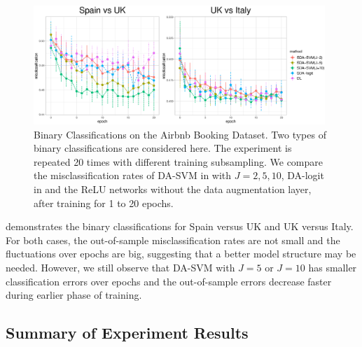 \documentclass[ba]{imsart}
\numberwithin{equation}{section}
\theoremstyle{plain}
\begin{document}
\begin{figure}[!ht]
\centering
\includegraphics[width=0.98\textwidth, height=0.4\textwidth]{fig/airbnb_adam.eps}
\vspace{-0.15in}
\caption{Binary Classifications on the Airbnb Booking Dataset. Two types of binary classifications are considered here. The experiment is repeated 20 times with different training subsampling. We compare the misclassification rates of DA-SVM in  with $J=2, 5, 10$, DA-logit in  and the ReLU networks without the data augmentation layer, after training for 1 to 20 epochs. }\label{fig:airbnb}
\vspace{-0.15in}
\end{figure}

 demonstrates the binary classifications for Spain versus UK and UK versus Italy. For both cases, the out-of-sample misclassification rates are not small  and the fluctuations over epochs are big, suggesting that a better model structure may be needed. However, we still observe that DA-SVM with $J=5$ or $J=10$ has  smaller classification errors over epochs and the out-of-sample errors decrease faster during earlier phase of training.


\subsection{Summary of Experiment Results}
\end{document}
